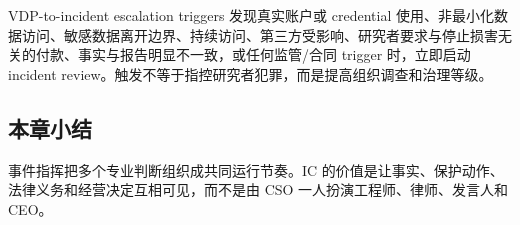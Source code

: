 \begin{importantbox}{VDP-to-incident escalation triggers}
发现真实账户或 credential 使用、非最小化数据访问、敏感数据离开边界、持续访问、第三方受影响、研究者要求与停止损害无关的付款、事实与报告明显不一致，或任何监管/合同 trigger 时，立即启动 incident review。触发不等于指控研究者犯罪，而是提高组织调查和治理等级。
\end{importantbox}

\subsection{本章小结}

事件指挥把多个专业判断组织成共同运行节奏。IC 的价值是让事实、保护动作、法律义务和经营决定互相可见，而不是由 CSO 一人扮演工程师、律师、发言人和 CEO。

